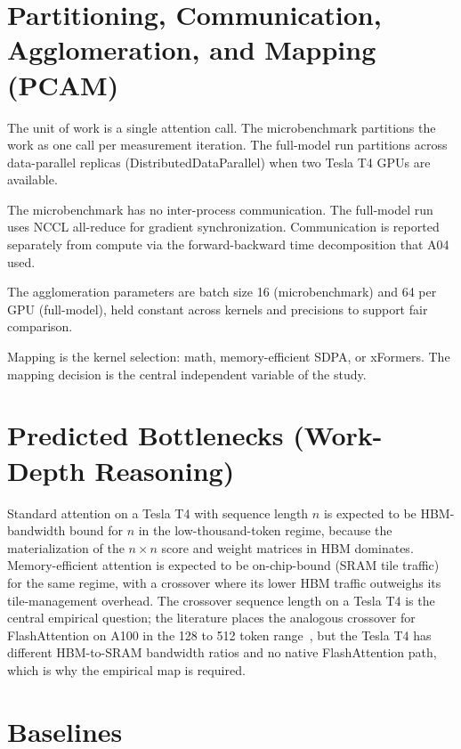 \documentclass[11pt]{article}
\begin{document}
\section{Partitioning, Communication, Agglomeration, and Mapping (PCAM)}

\begin{description}[leftmargin=2em]
    \item[Partitioning.] The unit of work is a single attention call. The microbenchmark partitions the work as one call per measurement iteration. The full-model run partitions across data-parallel replicas (DistributedDataParallel) when two Tesla T4 GPUs are available.
    \item[Communication.] The microbenchmark has no inter-process communication. The full-model run uses NCCL all-reduce for gradient synchronization. Communication is reported separately from compute via the forward-backward time decomposition that A04 used.
    \item[Agglomeration.] The agglomeration parameters are batch size 16 (microbenchmark) and 64 per GPU (full-model), held constant across kernels and precisions to support fair comparison.
    \item[Mapping.] Mapping is the kernel selection: math, memory-efficient SDPA, or xFormers. The mapping decision is the central independent variable of the study.
\end{description}

\section{Predicted Bottlenecks (Work-Depth Reasoning)}

Standard attention on a Tesla T4 with sequence length $n$ is expected to be HBM-bandwidth bound for $n$ in the low-thousand-token regime, because the materialization of the $n \times n$ score and weight matrices in HBM dominates. Memory-efficient attention is expected to be on-chip-bound (SRAM tile traffic) for the same regime, with a crossover where its lower HBM traffic outweighs its tile-management overhead. The crossover sequence length on a Tesla T4 is the central empirical question; the literature places the analogous crossover for FlashAttention on A100 in the 128 to 512 token range~\parencite{dao2022flashattentionfastmemoryefficientexact}, but the Tesla T4 has different HBM-to-SRAM bandwidth ratios and no native FlashAttention path, which is why the empirical map is required.

\section{Baselines}
\end{document}

